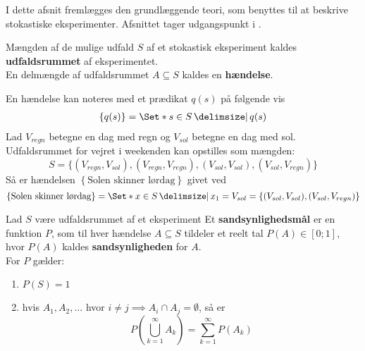 I dette afsnit fremlægges den grundlæggende teori, som benyttes til at beskrive stokastiske eksperimenter. Afsnittet tager udgangspunkt i \cite{sandsynlighedsBog}.
\begin{defn}
Mængden af de mulige udfald $S$ af et stokastisk eksperiment kaldes \textbf{udfaldsrummet} af eksperimentet.\\
En delmængde af udfaldsrummet $A\subseteq S$ kaldes en \textbf{hændelse}.
\end{defn}

En hændelse kan noteres med et prædikat $q(s)$ på følgende vis
\begin{align*}
    \left\{q(s)\right\} = \Set*{s\in S\given q(s)}
\end{align*}
Lad $V_{regn}$ betegne en dag med regn og $V_{sol}$ betegne en dag med sol. Udfaldsrummet for vejret i weekenden kan opstilles som mængden:
\begin{equation*}
    S = \{(V_{regn}, V_{sol}), (V_{regn}, V_{regn}), (V_{sol}, V_{sol}), (V_{sol}, V_{regn})\}
\end{equation*}
Så er hændelsen $\left\{\text{Solen skinner lørdag}\right\}$ givet ved
\begin{equation*}
    \left\{\text{Solen skinner lørdag}\right\} = \Set*{x \in S \given x_1 = V_{sol}} = \left\{(V_{sol}, V_{sol}), (V_{sol}, V_{regn})\right\}%
\end{equation*}

\begin{defn}  \label{def:axiomsOfPropability}
Lad $S$ være udfaldsrummet af et eksperiment
Et \textbf{sandsynlighedsmål} er en funktion $P$, som til hver hændelse $A \subseteq S$ tildeler et reelt tal $P(A) \in [0; 1]$, hvor $P(A)$ kaldes \textbf{sandsynligheden} for $A$. \\
For $P$ gælder:
\begin{enumerate}
    \item $P(S)=1$
    \item hvis $A_1,A_2,\ldots$ hvor $i \neq j \implies A_i\cap A_j=\emptyset$, så er 
    \begin{equation*}
        P\left(\bigcup_{k=1}^\infty A_k\right)=\sum_{k=1}^\infty P(A_k)
    \end{equation*} \label{enu:axiomsOfPropability2}
\end{enumerate}
\end{defn}

